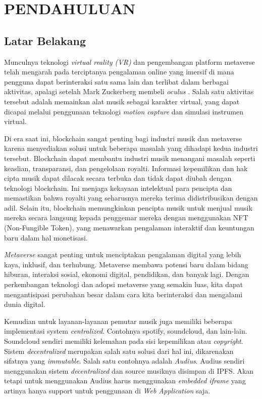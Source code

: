 \chapter{PENDAHULUAN}
\label{chap:pendahuluan}


\section{Latar Belakang}
\label{sec:latarbelakang}

Munculnya teknologi \emph{virtual reality (VR)} dan pengembangan platform metaverse telah mengarah pada terciptanya
pengalaman online yang imersif di mana pengguna dapat berinteraksi satu sama lain dan terlibat dalam berbagai aktivitas, apalagi setelah  Mark Zuckerberg
membeli \emph{oculus} \parencite{luckerson2014facebook}.
Salah satu aktivitas tersebut adalah memainkan alat musik sebagai karakter virtual, yang dapat dicapai melalui penggunaan
teknologi \emph{motion capture} dan simulasi instrumen virtual.

Di era saat ini, blockchain sangat penting bagi industri musik dan metaverse karena menyediakan solusi untuk beberapa masalah yang dihadapi kedua industri tersebut.
Blockchain dapat membantu industri musik menangani masalah seperti keaslian, transparansi, dan pengelolaan royalti. Informasi kepemilikan dan hak cipta musik dapat dilacak secara terbuka dan tidak dapat diubah dengan teknologi blockchain. Ini menjaga kekayaan intelektual para pencipta dan memastikan bahwa royalti yang seharusnya mereka terima didistribusikan dengan adil. Selain itu, blockchain memungkinkan pencipta musik untuk menjual musik mereka secara langsung kepada penggemar mereka dengan menggunakan NFT (Non-Fungible Token), yang menawarkan pengalaman interaktif dan keuntungan baru dalam hal monetisasi.

\emph{Metaverse} sangat penting untuk menciptakan pengalaman digital yang lebih kaya, inklusif, dan terhubung. Metaverse membawa potensi baru dalam bidang hiburan, interaksi sosial, ekonomi digital, pendidikan, dan banyak lagi. Dengan perkembangan teknologi dan adopsi metaverse yang semakin luas, kita dapat mengantisipasi perubahan besar dalam cara kita berinteraksi dan mengalami dunia digital.

Kemudian untuk layanan-layanan pemutar musik juga memiliki beberapa implementasi system \emph{centralized}. Contohnya spotify, soundcloud, dan lain-lain.
Soundcloud sendiri memiliki kelemahan pada sisi kepemilikan atau \emph{copyright}. Sistem \emph{decentralized} merupakan salah satu solusi dari hal ini, dikarenakan
sifatnya yang \emph{immutable}. Salah satu contohnya adalah \emph{Audius}. Audius sendiri menggunakan sistem \emph{decentralized} dan source musiknya disimpan di IPFS.
Akan tetapi untuk menggunakan Audius harus menggunakan \emph{embedded iframe} yang artinya hanya support untuk penggunaan di \emph{Web Application} saja.

